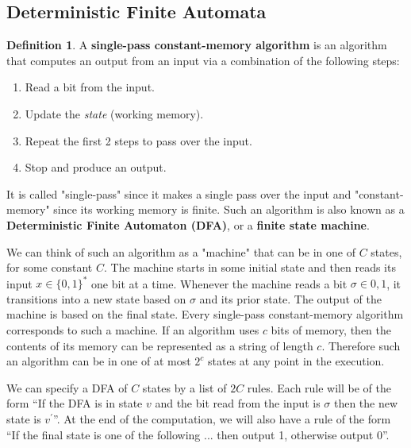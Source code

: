 \documentclass[a4paper, 12pt]{report}
\theoremstyle{remark}
\theoremstyle{definition}
\newtheorem{definition}{Definition}[section]
\begin{document}
\subsection{Deterministic Finite Automata}

\begin{definition}
A \textbf{single-pass constant-memory algorithm} is an algorithm that computes an output from an input via a combination of the following steps: 
\begin{enumerate}
    \item Read a bit from the input. 
    \item Update the \textit{state} (working memory). 
    \item Repeat the first 2 steps to pass over the input. 
    \item Stop and produce an output. 
\end{enumerate}
It is called "single-pass" since it makes a single pass over the input and "constant-memory" since its working memory is finite. Such an algorithm is also known as a \textbf{Deterministic Finite Automaton (DFA)}, or a \textbf{finite state machine}. 

We can think of such an algorithm as a "machine" that can be in one of $C$ states, for some constant $C$. The machine starts in some initial state and then reads its input $x \in \{0, 1\}^*$ one bit at a time. Whenever the machine reads a bit $\sigma \in {0, 1}$, it transitions into a new state based on $\sigma$ and its prior state. The output of the machine is based on the final state. Every single-pass constant-memory algorithm corresponds to such a machine. If an algorithm uses $c$ bits of memory, then the contents of its memory can be represented as a string of length $c$. Therefore such an algorithm can be in one of at most $2^c$ states at any point in the execution.

We can specify a DFA of $C$ states by a list of $2C$ rules. Each rule will be of the form “If the DFA is in state $v$ and the bit read from the input is $\sigma$ then the new state is $v^\prime$”. At the end of the computation, we will also have a rule of the form “If the final state is one of the following ... then output 1, otherwise output 0”. 
\end{definition}
\end{document}
